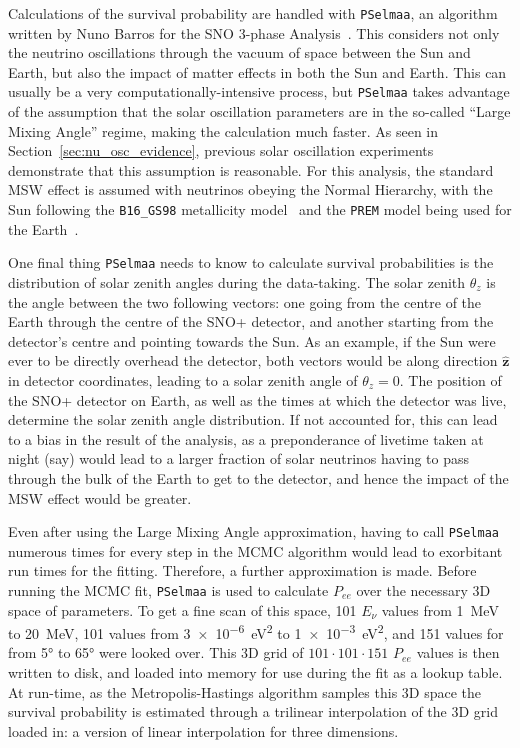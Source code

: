 Calculations of the survival probability are handled with \texttt{PSelmaa}, an algorithm written by Nuno Barros for the SNO 3-phase Analysis~\cite{barrosPrecisionMeasurementNeutrino2011}. %
This considers not only the neutrino oscillations through the vacuum of space between the Sun and Earth, but also the impact of matter effects in both the Sun and Earth. This can usually be a very computationally-intensive process, but \texttt{PSelmaa} takes advantage of the assumption that the solar oscillation parameters are in the so-called ``Large Mixing Angle'' regime, making the calculation much faster. As seen in Section~\ref{sec:nu_osc_evidence}, %
previous solar oscillation experiments demonstrate that this assumption is reasonable. For this analysis, the standard MSW effect is assumed with neutrinos obeying the Normal Hierarchy, with the Sun following the \texttt{B16\_GS98} metallicity model~\cite{vinyolesB16StandardSolar2018} %
and the \texttt{PREM} model being used for the Earth~\cite{dziewonskiPreliminaryReferenceEarth1981}. %

One final thing \texttt{PSelmaa} needs to know to calculate survival probabilities is the distribution of solar zenith angles during the data-taking. The solar zenith $\theta_{z}$ is the angle between the two following vectors: one going from the centre of the Earth through the centre of the SNO+ detector, and another starting from the detector's centre and pointing towards the Sun. As an example, if the Sun were ever to be directly overhead the detector, both vectors would be along direction $\bm{\hat{z}}$ in detector coordinates, leading to a solar zenith angle of $\theta_{z}=0$. The position of the SNO+ detector on Earth, as well as the times at which the detector was live, determine the solar zenith angle distribution. If not accounted for, this can lead to a bias in the result of the analysis, as a preponderance of livetime taken at night (say) would lead to a larger fraction of solar neutrinos having to pass through the bulk of the Earth to get to the detector, and hence the impact of the MSW effect would be greater.

Even after using the Large Mixing Angle approximation, having to call \texttt{PSelmaa} numerous times for every step in the MCMC algorithm would lead to exorbitant run times for the fitting. Therefore, a further approximation is made. Before running the MCMC fit, \texttt{PSelmaa} is used to calculate $P_{ee}$ over the necessary 3D space of parameters. To get a fine scan of this space, 101 $E_{\nu}$ values from \SI{1}{\MeV} to \SI{20}{\MeV}, 101 \dmsq{} values from \SI{3e-6}{\eV\squared} to \SI{1e-3}{\eV\squared}, and 151 values for \tonetwo{} from \ang{5} to \ang{65} were looked over. This 3D grid of $101\cdot101\cdot151$ $P_{ee}$ values is then written to disk, and loaded into memory for use during the fit as a lookup table. At run-time, as the Metropolis-Hastings algorithm samples this 3D space the survival probability is estimated through a trilinear interpolation of the 3D grid loaded in: a version of linear interpolation for three dimensions.


